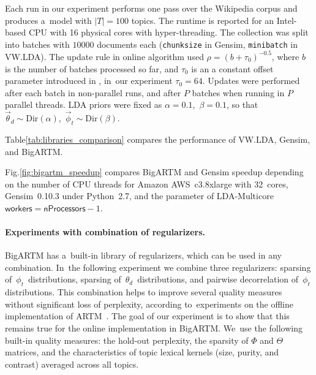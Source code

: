 \documentclass[russian]{llncs}
\newcommand{\kw}[1]{\textsf{#1}}
\begin{document}
Each run in our experiment performs one pass over the Wikipedia corpus and produces a~model with $|T|=100$ topics.
The runtime is reported for an Intel-based CPU with 16 physical cores with hyper-threading.
The collection was split into batches with $10 000$ documents each
(\texttt{chunksize} in Gensim, \texttt{minibatch} in VW.LDA).
The update rule in online algorithm used
${\rho = (b + \tau_0)^{-0.5}}$,
where $b$ is the number of batches processed so far,
and $\tau_0$ is an a constant offset parameter introduced in \cite{hoffman10online},
in~our experiment ${\tau_0 = 64}$.
Updates were performed after each batch in non-parallel runs, and after $P$ batches when running in $P$ parallel threads.
LDA priors were fixed as
${\alpha = 0.1}$,\, ${\beta = 0.1}$,
so that
$\vec{\theta}_d \sim \text{Dir}(\alpha)$,\,
$\vec{\phi}_t \sim \text{Dir}(\beta)$.

Table\;\ref{tab:libraries_comparison} compares the performance of VW.LDA, Gensim, and BigARTM.

Fig.\;\ref{fig:bigartm_speedup} compares BigARTM and Gensim speedup depending on the number of CPU threads
for Amazon AWS~c3.8xlarge with 32~cores,
Gensim~\mbox{0.10.3} under Python~\mbox{2.7},
and the parameter of LDA-Multicore $\kw{workers}=\kw{nProcessors}-1$.


\paragraph{Experiments with combination of regularizers.}

BigARTM has a~built-in library of regularizers, which can be used in any combination.
In~the following experiment we combine three regularizers:
sparsing of~$\phi_{t}$~distributions,
sparsing of~$\theta_{d}$~distributions, and
pairwise decorrelation of~$\phi_{t}$ distributions.
This combination helps to improve several quality measures without significant loss of perplexity,
according to~experiments on the offline implementation of ARTM~\cite{voron14aist}.
The goal of our experiment is to show that this remains true
for the online implementation in BigARTM.
We~use the following built-in quality measures:
the hold-out perplexity,
the sparsity of $\Phi$ and $\Theta$ matrices, and
the characteristics of topic lexical kernels (size, purity, and contrast) averaged across all topics.
\end{document}
